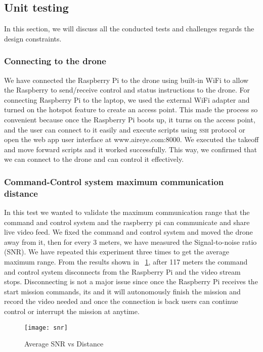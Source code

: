\documentclass[../main.tex]{subfiles}
\begin{document}
\subsection{Unit testing}
In this section, we will discuss all the conducted tests 
and challenges regards the design constraints. 

\subsubsection{Connecting to the drone}

We have connected the
Raspberry Pi to the drone using built-in WiFi
to allow the Raspberry to send/receive control and status 
instructions to the drone. 
For connecting Raspberry Pi to the laptop, 
we used the external WiFi adapter and turned 
on the hotspot feature to create an access point.
This made the process so convenient because 
once the Raspberry Pi boots up, it turns on the 
access point, and the user can connect to it 
easily and execute scripts using \textsc{ssh} 
protocol or open the web app user interface 
at www.aireye.com:8000. We executed the takeoff 
and move forward scripts and it worked successfully.
This way, we confirmed that we can connect to the drone and can control it effectively.

\subsubsection{Command-Control system maximum communication distance}

In this test we wanted to validate the maximum communication range that
the command and control system and the raspberry pi can communicate
and share live video feed. We fixed the command and control system and moved
the drone away from it, then for every 3 meters, we have 
measured the Signal-to-noise ratio (SNR).
We have repeated this experiment three times to get the average maximum range.
From the results shown in ~\ref{fig:snr-vs-distance}, after 117 meters 
the command and control system disconnects from the Raspberry Pi
and the video stream stops. Disconnecting is not a major issue
since once the Raspberry Pi receives the start mission commands, its 
and it will autonomously finish the mission and record the video needed
and once the connection is back users can continue control or interrupt the mission
at anytime.
 
\begin{figure}[!t]
	\centering
	\texttt{[image: snr]}
	\caption{Average SNR vs Distance}
	\label{fig:snr-vs-distance}
\end{figure}
\end{document}
